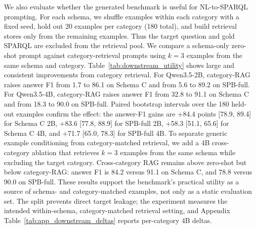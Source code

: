 \documentclass[11pt]{article}
\begin{document}
We also evaluate whether the generated benchmark is useful for NL-to-SPARQL prompting. For each schema, we shuffle examples within each category with a fixed seed, hold out 20 examples per category (180 total), and build retrieval stores only from the remaining examples. Thus the target question and gold SPARQL are excluded from the retrieval pool. We compare a schema-only zero-shot prompt against category-retrieval prompts using \(k=3\) examples from the same schema and category. Table~\ref{tab:downstream_utility} shows large and consistent improvements from category retrieval. For Qwen3.5-2B, category-RAG raises answer F1 from 1.7 to 86.1 on Schema C and from 5.6 to 89.2 on SPB-full. For Qwen3.5-4B, category-RAG raises answer F1 from 32.8 to 91.1 on Schema C and from 18.3 to 90.0 on SPB-full. Paired bootstrap intervals over the 180 held-out examples confirm the effect: the answer-F1 gains are +84.4 points [78.9, 89.4] for Schema C 2B, +83.6 [77.8, 88.9] for SPB-full 2B, +58.3 [51.1, 65.6] for Schema C 4B, and +71.7 [65.0, 78.3] for SPB-full 4B. To separate generic example conditioning from category-matched retrieval, we add a 4B cross-category ablation that retrieves \(k=3\) examples from the same schema while excluding the target category. Cross-category RAG remains above zero-shot but below category-RAG: answer F1 is 84.2 versus 91.1 on Schema C, and 78.8 versus 90.0 on SPB-full. These results support the benchmark's practical utility as a source of schema- and category-matched examples, not only as a static evaluation set. The split prevents direct target leakage; the experiment measures the intended within-schema, category-matched retrieval setting, and Appendix Table~\ref{tab:app_downstream_deltas} reports per-category 4B deltas.
\end{document}
